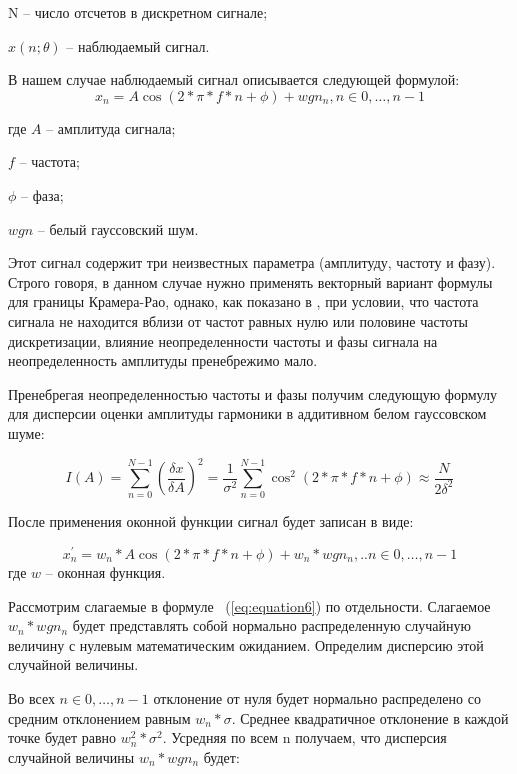 N -- число отсчетов в дискретном сигнале;

$x(n;\theta)$ -- наблюдаемый сигнал.

В нашем случае наблюдаемый сигнал описывается следующей формулой:
\begin{equation}
	\label{eq:equation4}
	x_n=A\cos(2*\pi*f*n+\phi)+wgn_n, n\in0,…,n-1
\end{equation}

где $A$ -- амплитуда сигнала;

$f$ -- частота;

$\phi$ -- фаза;

$wgn$ -- белый гауссовский шум.

Этот сигнал содержит три неизвестных параметра (амплитуду, частоту и фазу). Строго говоря, в данном случае нужно применять векторный вариант формулы для границы Крамера-Рао, однако, как показано в \cite{kay1993fundamentals}, при условии, что частота сигнала не находится вблизи от частот равных нулю или половине частоты дискретизации, влияние неопределенности частоты и фазы сигнала на неопределенность амплитуды пренебрежимо мало.

Пренебрегая неопределенностью частоты и фазы получим следующую формулу для дисперсии оценки амплитуды гармоники в аддитивном белом гауссовском шуме: 

\begin{equation}
	\label{eq:equation5}
	I(A)=\sum_{n=0}^{N-1}\left( \frac{\delta x}{\delta A} \right)^2 =\frac{1}{\sigma^2} \sum_{n=0}^{N-1}\cos^2 (2*\pi*f*n+\phi)\approx \frac{N}{2\delta ^2 }
\end{equation}

После применения оконной функции сигнал будет записан в виде: 

\begin{equation}
	\label{eq:equation6}
	x_n^{'}= w_n*A\cos(2*\pi*f*n+\phi)+w_n*wgn_n,..n\in 0,…,n-1
\end{equation}
где $w$ -- оконная функция.

Рассмотрим слагаемые в формуле ~(\ref{eq:equation6}) по отдельности. Слагаемое $w_n*wgn_n$ будет представлять собой нормально распределенную случайную величину с нулевым математическим ожиданием. Определим дисперсию этой случайной величины.

Во всех $n\in 0,…,n-1$ отклонение от нуля будет нормально распределено со средним отклонением равным $w_n*\sigma$. Среднее квадратичное отклонение в каждой точке будет равно $w_n^2*\sigma^2$. Усредняя по всем n получаем, что дисперсия случайной величины $w_n*wgn_n$ будет: 

